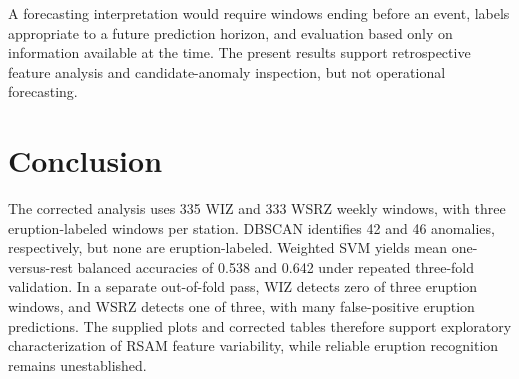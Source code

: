 \documentclass[11pt,a4paper]{article}
\begin{document}
A forecasting interpretation would require windows ending before an event, labels appropriate to a future prediction horizon, and evaluation based only on information available at the time. The present results support retrospective feature analysis and candidate-anomaly inspection, but not operational forecasting.
	
\section{Conclusion}
The corrected analysis uses 335 WIZ and 333 WSRZ weekly windows, with three eruption-labeled windows per station. DBSCAN identifies 42 and 46 anomalies, respectively, but none are eruption-labeled. Weighted SVM yields mean one-versus-rest balanced accuracies of 0.538 and 0.642 under repeated three-fold validation. In a separate out-of-fold pass, WIZ detects zero of three eruption windows, and WSRZ detects one of three, with many false-positive eruption predictions. The supplied plots and corrected tables therefore support exploratory characterization of RSAM feature variability, while reliable eruption recognition remains unestablished.
	
	
	
\end{document}
